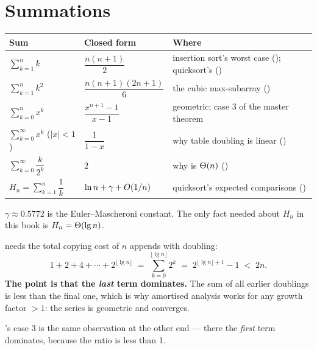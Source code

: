 \section{Summations}

\begin{conceptbox}
\begin{longtable}{@{}L{5.6cm}L{3.2cm}L{5.5cm}@{}}
\toprule
{}
\textbf{Sum} & \textbf{Closed form} & \textbf{Where} \\
\midrule
\endhead
$\displaystyle\sum_{k=1}^{n} k$ & $\dfrac{n(n+1)}{2}$ &
  insertion sort's worst case (); quicksort's
  () \\
$\displaystyle\sum_{k=1}^{n} k^{2}$ & $\dfrac{n(n+1)(2n+1)}{6}$ &
  the cubic max-subarray () \\
$\displaystyle\sum_{k=0}^{n} x^{k}$ & $\dfrac{x^{n+1}-1}{x-1}$ &
  geometric; case 3 of the master theorem \\
$\displaystyle\sum_{k=0}^{\infty} x^{k}$ ($|x|<1$) & $\dfrac{1}{1-x}$ &
  why table doubling is linear () \\
$\displaystyle\sum_{k=0}^{\infty} \dfrac{k}{2^{k}}$ & $2$ &
  why  is $\Theta(n)$ () \\
$H_{n} = \displaystyle\sum_{k=1}^{n} \dfrac{1}{k}$ & $\ln n + \gamma + O(1/n)$ &
  quicksort's expected comparisons () \\
\bottomrule
\end{longtable}

\smallskip
$\gamma \approx 0.5772$ is the Euler--Mascheroni constant. The only fact needed
about $H_{n}$ in this book is $H_{n} = \Theta(\operatorname{lg} n)$.
\end{conceptbox}

\begin{worked}
 needs the total copying cost of $n$ appends with doubling:
\[ 1 + 2 + 4 + \cdots + 2^{\lfloor \lg n \rfloor}
   \;=\; \sum_{k=0}^{\lfloor \lg n \rfloor} 2^{k}
   \;=\; 2^{\lfloor \lg n \rfloor + 1} - 1 \;<\; 2n. \]
\textbf{The point is that the \emph{last} term dominates.} The sum of all
earlier doublings is less than the final one, which is why amortised analysis
works for any growth factor $> 1$: the series is geometric and converges.

\smallskip
{}'s case 3 is the same observation at the other end --- there the
\emph{first} term dominates, because the ratio is less than 1.
\end{worked}

